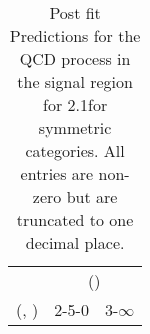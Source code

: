 \begin{table}[h!]
\tiny
\centering
\caption{Post fit Predictions for the QCD process in the signal region for 2.1\ifb for symmetric categories. All entries are non-zero but are truncated to one decimal place.\label{tab:predseppost_sig_qcd_sym}}
\begin{tabular}
{ccc}
	\hline\hline
	& \multicolumn{2}{c}{\scalht (\gev)} \\ 
	 (\njet,  \nb) & 2-5-0 & 3-$\infty$ \\ [0.8ex] 
\hline
	\hline
	\hline
\end{tabular}
\end{table}
